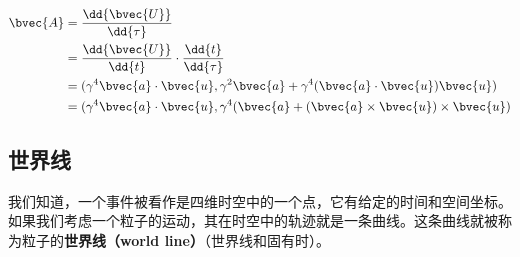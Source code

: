 \begin{equation}
\begin{aligned}
%
\bvec{A}&=\frac{\dd{\bvec{U}}}{\dd{\tau}}\\&=\frac{\dd{\bvec{U}}}{\dd{t}}\cdot\frac{\dd{t}}{\dd{\tau}}\\&=(\gamma^4\bvec{a}\cdot\bvec{u}, \gamma^2\bvec{a}+\gamma^4(\bvec{a}\cdot\bvec{u})\bvec{u})\\&=(\gamma^4\bvec{a}\cdot\bvec{u}, \gamma^4(\bvec{a}+(\bvec{a}\times\bvec{u})\times\bvec{u})
%
\end{aligned}
\end{equation}

\subsection{世界线}

我们知道，一个事件被看作是四维时空中的一个点，它有给定的时间和空间坐标。如果我们考虑一个粒子的运动，其在时空中的轨迹就是一条曲线。这条曲线就被称为粒子的\textbf{世界线（world line）}（世界线和固有时）。


